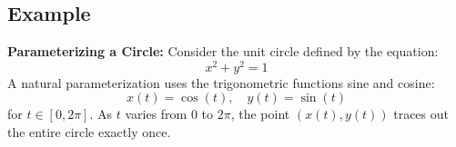 \subsection{Example}

\textbf{Parameterizing a Circle:}  
Consider the unit circle defined by the equation:
\[
x^2 + y^2 = 1
\]
A natural parameterization uses the trigonometric functions sine and cosine:
\[
x(t) = \cos(t), \quad y(t) = \sin(t)
\]
for \( t \in [0, 2\pi] \).  
As \( t \) varies from \( 0 \) to \( 2\pi \), the point \( (x(t), y(t)) \) traces out the entire circle exactly once.

\newpage